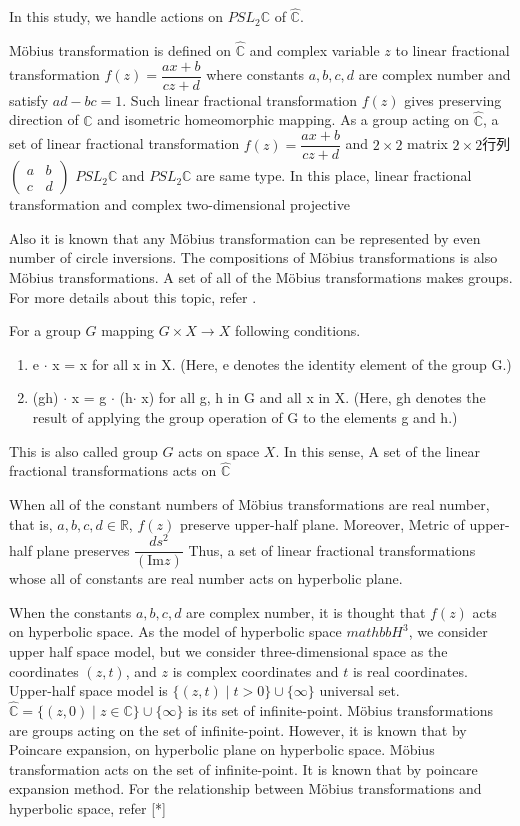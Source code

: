 In this study, we handle actions on $PSL_2\mathbb{C}$ of $\hat{\mathbb{C}}$.

M\"obius transformation is defined on $\hat{\mathbb{C}}$ and
complex variable $z$ to linear fractional transformation
$f(z)=\dfrac{ax+b}{cz+d}$ where constants $a, b, c, d$ are complex
number and satisfy $ad - bc = 1$.
Such linear fractional transformation $f(z)$ gives preserving direction of
$\hat{\mathbb{C}}$ and isometric homeomorphic mapping.
As a group acting on $\hat{\mathbb{C}}$, a set of linear fractional
transformation $f(z) = \dfrac{ax + b}{cz + d}$ and $2 \times 2$ matrix
$2\times 2$行列$\begin{pmatrix}a & b \\ c& d \end{pmatrix}$
$PSL_2\mathbb{C}$ and $PSL_2\mathbb{C}$ are same type.
In this place, linear fractional transformation and
complex two-dimensional
projective

Also it is known that any M\"obius transformation can be represented by
even number of circle inversions.
The compositions of M\"obius transformations is also M\"obius
transformations. A set of all of the M\"obius transformations makes
groups. For more details about this topic, refer \cite{marden_2016}.

For a group $G$ mapping $G \times X \to X$ following conditions.
\begin{enumerate}
 \item e $\cdot$ x = x for all x in X. (Here, e denotes the identity element of
       the group G.)
 \item (gh) $\cdot$ x = g $\cdot$ (h$\cdot$ x) for all g, h in G and all x in X.
       (Here, gh denotes the result of applying the group operation of G to the elements g and h.)
\end{enumerate}

This is also called group $G$ acts on space $X$.
In this sense, A set of the linear fractional transformations acts on
$\hat{\mathbb{C}}$

When all of the constant numbers of M\"obius transformations are real number,
that is, $a, b, c, d \in \mathbb{R}$, $f(z)$ preserve upper-half plane.
Moreover, Metric of upper-half plane preserves
$\dfrac{ds^2}{(\mathrm{Im}z)}$
Thus, a set of linear fractional transformations whose all of constants
are real number acts on hyperbolic plane.

When the constants $a, b, c, d$ are complex number, it is thought that
$f(z)$ acts on hyperbolic space.
As the model of hyperbolic space $mathbb{H}^3$, we consider upper half
space model, but we consider three-dimensional space as the coordinates
$(z, t)$, and $z$ is complex coordinates and $t$ is real coordinates.
Upper-half space model is $\{(z,t) \mid t>0\}\cup \{ \infty \}$
universal set.
$\hat{\mathbb{C}} = \{ (z,0) \mid z \in \mathbb{C}\} \cup \{ \infty\}$
is its set of infinite-point. M\"obius transformations are groups acting on
the set of infinite-point. However, it is known that by Poincare
expansion, on hyperbolic plane on hyperbolic space.
M\"obius transformation acts on the set of infinite-point. It is known
that by poincare expansion method.
For the relationship between M\"obius transformations and hyperbolic
space, refer [*]

